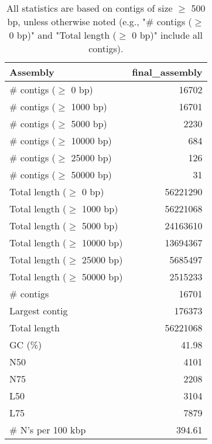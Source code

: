 \documentclass[12pt,a4paper]{article}
\begin{document}
\begin{table}[ht]
\begin{center}
\caption{All statistics are based on contigs of size $\geq$ 500 bp, unless otherwise noted (e.g., "\# contigs ($\geq$ 0 bp)" and "Total length ($\geq$ 0 bp)" include all contigs).}
\begin{tabular}{|l*{1}{|r}|}
\hline
Assembly & final\_assembly \\ \hline
\# contigs ($\geq$ 0 bp) & 16702 \\ \hline
\# contigs ($\geq$ 1000 bp) & 16701 \\ \hline
\# contigs ($\geq$ 5000 bp) & 2230 \\ \hline
\# contigs ($\geq$ 10000 bp) & 684 \\ \hline
\# contigs ($\geq$ 25000 bp) & 126 \\ \hline
\# contigs ($\geq$ 50000 bp) & 31 \\ \hline
Total length ($\geq$ 0 bp) & 56221290 \\ \hline
Total length ($\geq$ 1000 bp) & 56221068 \\ \hline
Total length ($\geq$ 5000 bp) & 24163610 \\ \hline
Total length ($\geq$ 10000 bp) & 13694367 \\ \hline
Total length ($\geq$ 25000 bp) & 5685497 \\ \hline
Total length ($\geq$ 50000 bp) & 2515233 \\ \hline
\# contigs & 16701 \\ \hline
Largest contig & 176373 \\ \hline
Total length & 56221068 \\ \hline
GC (\%) & 41.98 \\ \hline
N50 & 4101 \\ \hline
N75 & 2208 \\ \hline
L50 & 3104 \\ \hline
L75 & 7879 \\ \hline
\# N's per 100 kbp & 394.61 \\ \hline
\end{tabular}
\end{center}
\end{table}
\end{document}
